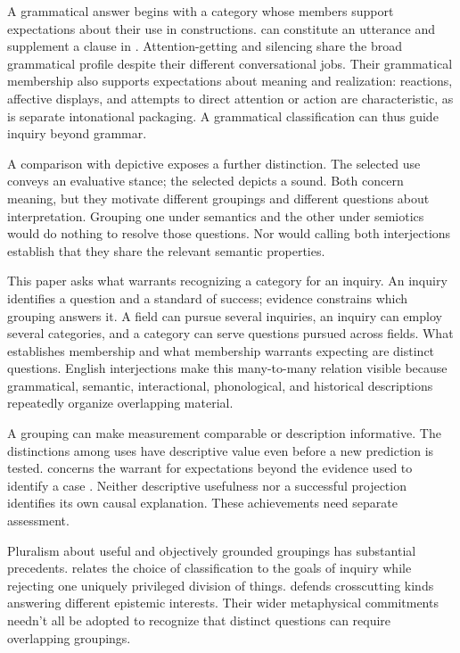 \documentclass[12pt]{article}
\begin{document}
A grammatical answer begins with a category whose members support
expectations about their use in constructions.  can
constitute an utterance and supplement a clause in . Attention-getting  and silencing  share
the broad grammatical profile despite their different conversational
jobs. Their grammatical membership also supports expectations about
meaning and realization: reactions, affective displays, and attempts to
direct attention or action are characteristic, as is separate intonational
packaging. A grammatical classification can thus guide inquiry beyond grammar.

A comparison with depictive  exposes a further distinction.
The selected  use conveys an evaluative stance; the selected
 depicts a sound. Both concern meaning, but they motivate
different groupings and different questions about interpretation. Grouping
one under semantics and the other under semiotics would do nothing to
resolve those questions. Nor would calling both interjections establish
that they share the relevant semantic properties.

This paper asks what warrants recognizing a category for an inquiry.
An inquiry identifies a question and a standard of success; evidence
constrains which grouping answers it. A field can pursue several inquiries,
an inquiry can employ several categories, and a category can serve questions
pursued across fields. What establishes membership and what membership
warrants expecting are distinct questions. English interjections make this many-to-many relation
visible because grammatical, semantic, interactional, phonological, and
historical descriptions repeatedly organize overlapping material.

A grouping can make measurement comparable or description informative.
The distinctions among  uses have descriptive value even
before a new prediction is tested.  concerns the
warrant for expectations beyond the evidence used to identify a case
\citep{Goodman1955}. Neither descriptive usefulness nor a successful
projection identifies its own causal explanation. These achievements
need separate assessment.

Pluralism about useful and objectively grounded groupings has substantial
precedents. \textcite[5--7, 17--18]{dupre1993disorder} relates the choice of
classification to the goals of inquiry while rejecting one uniquely
privileged division of things. \textcite[63--64, 69--72]{khalidi2013}
defends crosscutting kinds answering different epistemic interests.
Their wider metaphysical commitments needn't all be adopted to recognize
that distinct questions can require overlapping groupings.
\end{document}
